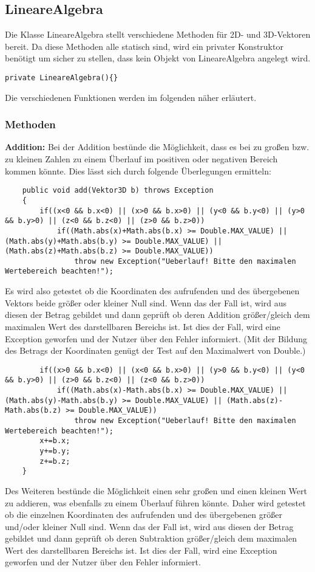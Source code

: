 \documentclass[a4paper,11pt]{scrartcl}
\begin{document}
\subsection{LineareAlgebra}
Die Klasse LineareAlgebra stellt verschiedene Methoden für 2D- und 3D-Vektoren bereit. Da diese Methoden alle statisch sind, wird ein privater Konstruktor benötigt um sicher zu stellen, dass kein Objekt von LineareAlgebra angelegt wird. 
\begin{lstlisting}
private LineareAlgebra(){}
\end{lstlisting}
Die verschiedenen Funktionen werden im folgenden näher erläutert.
\subsubsection{Methoden}
\textbf{Addition:}  Bei der Addition bestünde die Möglichkeit, dass es bei zu großen bzw. zu kleinen Zahlen zu einem Überlauf im positiven oder negativen Bereich kommen könnte. Dies lässt sich durch folgende Überlegungen ermitteln:
\begin{lstlisting}
	public void add(Vektor3D b) throws Exception
	{
		if((x<0 && b.x<0) || (x>0 && b.x>0) || (y<0 && b.y<0) || (y>0 && b.y>0) || (z<0 && b.z<0) || (z>0 && b.z>0))
			if((Math.abs(x)+Math.abs(b.x) >= Double.MAX_VALUE) || (Math.abs(y)+Math.abs(b.y) >= Double.MAX_VALUE) || (Math.abs(z)+Math.abs(b.z) >= Double.MAX_VALUE))
				throw new Exception("Ueberlauf! Bitte den maximalen Wertebereich beachten!");
\end{lstlisting}
Es wird also getestet ob die Koordinaten des aufrufenden und des übergebenen Vektors beide größer oder kleiner Null sind. Wenn das der Fall ist, wird aus diesen der Betrag gebildet und dann geprüft ob deren Addition größer/gleich dem maximalen Wert des darstellbaren Bereichs ist. Ist dies der Fall, wird eine Exception geworfen und der Nutzer über den Fehler informiert.
(Mit der Bildung des Betrags der Koordinaten genügt der Test auf den Maximalwert von Double.)
\begin{lstlisting}		
		if((x>0 && b.x<0) || (x<0 && b.x>0) || (y>0 && b.y<0) || (y<0 && b.y>0) || (z>0 && b.z<0) || (z<0 && b.z>0))
			if((Math.abs(x)-Math.abs(b.x) >= Double.MAX_VALUE) || (Math.abs(y)-Math.abs(b.y) >= Double.MAX_VALUE) || (Math.abs(z)-Math.abs(b.z) >= Double.MAX_VALUE))
				throw new Exception("Ueberlauf! Bitte den maximalen Wertebereich beachten!");
		x+=b.x;
		y+=b.y;
		z+=b.z;
	}
\end{lstlisting}
Des Weiteren bestünde die Möglichkeit einen sehr großen und einen kleinen Wert zu addieren, was ebenfalls zu einem Überlauf führen könnte. Daher wird getestet ob die einzelnen Koordinaten des aufrufenden und des übergebenen größer und/oder kleiner Null sind. Wenn das der Fall ist, wird aus diesen der Betrag gebildet und dann geprüft ob deren Subtraktion größer/gleich dem maximalen Wert des darstellbaren Bereichs ist. Ist dies der Fall, wird eine Exception geworfen und der Nutzer über den Fehler informiert.\\
\end{document}
